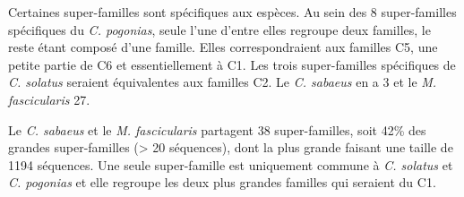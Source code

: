 \documentclass[12pt,a4paper]{article}
\begin{document}
	Certaines super-familles sont spécifiques aux espèces. Au sein des 8 super-familles spécifiques du \textit{C. pogonias}, seule l'une d'entre elles regroupe deux familles, le reste étant composé d'une famille. Elles correspondraient aux familles C5, une petite partie de C6 et essentiellement à C1. Les trois super-familles spécifiques de \textit{C. solatus} seraient équivalentes aux familles C2. Le \textit{C. sabaeus} en a 3 et le \textit{M. fascicularis} 27.
	
	Le \textit{C. sabaeus} et le \textit{M. fascicularis} partagent 38 super-familles, soit 42\% des grandes super-familles (> 20 séquences), dont la plus grande faisant une taille de 1194 séquences. Une seule super-famille est uniquement commune à \textit{C. solatus} et \textit{C. pogonias} et elle regroupe les deux plus grandes familles qui seraient du C1.
	
\end{document}

